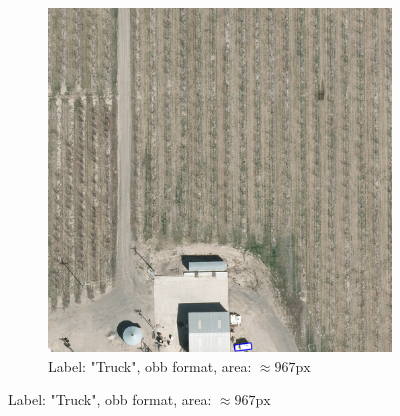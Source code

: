 \begin{figure}[h]
\begin{subfigure}[b]{0.45\textwidth}
        \includegraphics[trim={550pt 0pt 410pt 990pt},clip,width=\textwidth]{images/015Results/01abb_vs_obb/obb_truck.png}
        \caption{Label: "Truck", obb format, area: $\approx 967 \text{px}$}
        \label{fig:obb_truck}
    \end{subfigure}
    
    \vspace{0.5cm} %
    

\end{figure}
